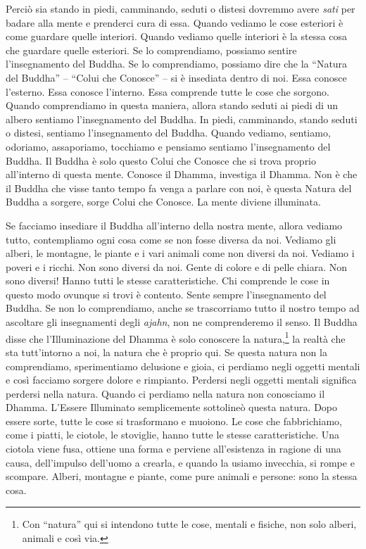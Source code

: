 Perciò sia stando in piedi, camminando, seduti o distesi dovremmo avere
\emph{sati} per badare alla mente e prenderci cura di essa. Quando
vediamo le cose esteriori è come guardare quelle interiori. Quando
vediamo quelle interiori è la stessa cosa che guardare quelle esteriori.
Se lo comprendiamo, possiamo sentire l'insegnamento del Buddha. Se lo
comprendiamo, possiamo dire che la ``Natura del Buddha'' -- ``Colui che
Conosce'' -- si è insediata dentro di noi. Essa conosce l'esterno. Essa
conosce l'interno. Essa comprende tutte le cose che sorgono. Quando
comprendiamo in questa maniera, allora stando seduti ai piedi di un
albero sentiamo l'insegnamento del Buddha. In piedi, camminando, stando
seduti o distesi, sentiamo l'insegnamento del Buddha. Quando vediamo,
sentiamo, odoriamo, assaporiamo, tocchiamo e pensiamo sentiamo
l'insegnamento del Buddha. Il Buddha è solo questo Colui che Conosce che
si trova proprio all'interno di questa mente. Conosce il Dhamma,
investiga il Dhamma. Non è che il Buddha che visse tanto tempo fa venga
a parlare con noi, è questa Natura del Buddha a sorgere, sorge Colui che
Conosce. La mente diviene illuminata.

Se facciamo insediare il Buddha all'interno della nostra mente, allora
vediamo tutto, contempliamo ogni cosa come se non fosse diversa da noi.
Vediamo gli alberi, le montagne, le piante e i vari animali come non
diversi da noi. Vediamo i poveri e i ricchi. Non sono diversi da noi.
Gente di colore e di pelle chiara. Non sono diversi! Hanno tutti le
stesse caratteristiche. Chi comprende le cose in questo modo ovunque si
trovi è contento. Sente sempre l'insegnamento del Buddha. Se non lo
comprendiamo, anche se trascorriamo tutto il nostro tempo ad ascoltare
gli insegnamenti degli \emph{ajahn}, non ne comprenderemo il senso. Il
Buddha disse che l'Illuminazione del Dhamma è solo conoscere la
natura,\footnote{Con ``natura'' qui si intendono tutte le cose, mentali
  e fisiche, non solo alberi, animali e così via.} la realtà che sta
tutt'intorno a noi, la natura che è proprio qui. Se questa natura non la
comprendiamo, sperimentiamo delusione e gioia, ci perdiamo negli oggetti
mentali e così facciamo sorgere dolore e rimpianto. Perdersi negli
oggetti mentali significa perdersi nella natura. Quando ci perdiamo
nella natura non conosciamo il Dhamma. L'Essere Illuminato semplicemente
sottolineò questa natura. Dopo essere sorte, tutte le cose si
trasformano e muoiono. Le cose che fabbrichiamo, come i piatti, le
ciotole, le stoviglie, hanno tutte le stesse caratteristiche. Una
ciotola viene fusa, ottiene una forma e perviene all'esistenza in
ragione di una causa, dell'impulso dell'uomo a crearla, e quando la
usiamo invecchia, si rompe e scompare. Alberi, montagne e piante, come
pure animali e persone: sono la stessa cosa.


